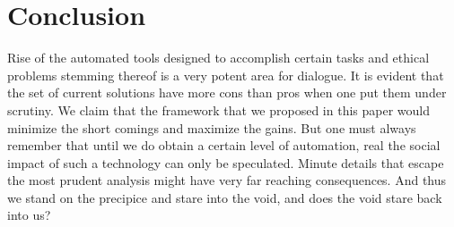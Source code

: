 \section{Conclusion}
\label{sec:-conc}
Rise of the automated tools designed to accomplish certain tasks and ethical problems stemming thereof is a very potent area for dialogue. It is evident that the set of current solutions have more cons than pros when one put them under scrutiny. We claim that the framework that we proposed in this paper would minimize the short comings and maximize the gains. But one must always remember that until we do obtain a certain level of automation, real the social impact of such a technology can only be speculated. Minute details that escape the most prudent analysis might have very far reaching consequences. And thus we stand on the precipice and stare into the void, and does the void stare back into us?

